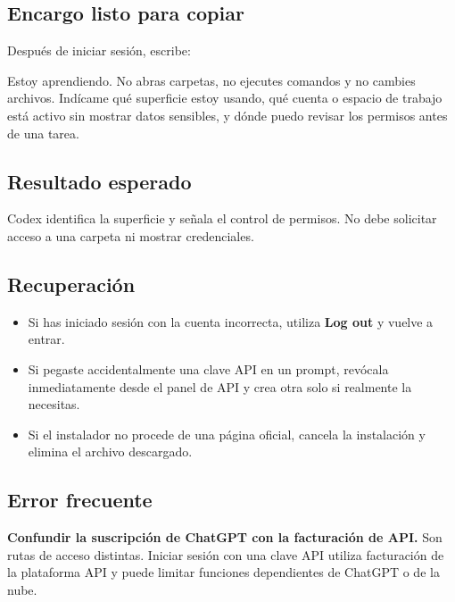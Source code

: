 \documentclass[10pt,a4paper,openany]{book}
\providecommand{\tightlist}{\setlength{\itemsep}{0.18em}\setlength{\parskip}{0pt}}
\newenvironment{Shaded}{}{}
\newcommand{\NormalTok}[1]{#1}
\renewenvironment{Shaded}
  {\begin{tcolorbox}[
    enhanced,
    breakable,
    colback=CodeBg,
    colframe=Border,
    boxrule=0.5pt,
    arc=2mm,
    left=3mm,
    right=3mm,
    top=2.2mm,
    bottom=2.2mm,
    before skip=0.8em,
    after skip=0.9em
  ]}
  {\end{tcolorbox}}
\begin{document}
\subsection{Encargo listo para
copiar}\label{encargo-listo-para-copiar-2}

Después de iniciar sesión, escribe:

\begin{Shaded}
\begin{Highlighting}[]
\NormalTok{Estoy aprendiendo. No abras carpetas, no ejecutes comandos y no cambies archivos.}
\NormalTok{Indícame qué superficie estoy usando, qué cuenta o espacio de trabajo está activo}
\NormalTok{sin mostrar datos sensibles, y dónde puedo revisar los permisos antes de una tarea.}
\end{Highlighting}
\end{Shaded}

\subsection{Resultado esperado}\label{resultado-esperado-1}

Codex identifica la superficie y señala el control de permisos. No debe
solicitar acceso a una carpeta ni mostrar credenciales.

\subsection{Recuperación}\label{recuperaciuxf3n}

\begin{itemize}
\tightlist
\item
  Si has iniciado sesión con la cuenta incorrecta, utiliza \textbf{Log
  out} y vuelve a entrar.
\item
  Si pegaste accidentalmente una clave API en un prompt, revócala
  inmediatamente desde el panel de API y crea otra solo si realmente la
  necesitas.
\item
  Si el instalador no procede de una página oficial, cancela la
  instalación y elimina el archivo descargado.
\end{itemize}

\subsection{Error frecuente}\label{error-frecuente-2}

\textbf{Confundir la suscripción de ChatGPT con la facturación de API.}
Son rutas de acceso distintas. Iniciar sesión con una clave API utiliza
facturación de la plataforma API y puede limitar funciones dependientes
de ChatGPT o de la nube.
\end{document}
